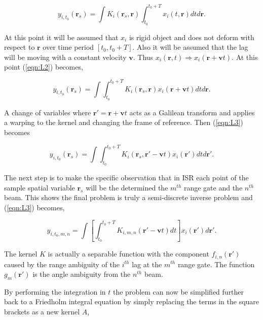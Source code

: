 \documentclass[10pt]{article}
\begin{document}
\begin{equation}
\label{eqn:L2}
y_{i,t_0}(\mathbf{r}_s) = \int K_i(\mathbf{r}_s,\mathbf{r})\int_{t_0}^{t_0+T} x_i(t,\mathbf{r})dtd\mathbf{r}.
\end{equation}

At this point it will be assumed that $x_i$ is rigid object and does not deform with respect to $\mathbf{r}$ over time period $[t_0,t_0+T]$. Also it will be assumed that the lag will be moving with a constant velocity $\mathbf{v}$. Thus $x_i(\mathbf{r},t)\Rightarrow x_i(\mathbf{r}+\mathbf{v}t)$. At this point (\ref{eqn:L2}) becomes,

\begin{equation}
\label{eqn:L3}
y_{i,t_0}(\mathbf{r}_s) = \int \int_{t_0}^{t_0+T} K_i(\mathbf{r}_s,\mathbf{r})x_i(\mathbf{r}+\mathbf{v}t)dtd\mathbf{r}.
\end{equation}

A change of variables where $\mathbf{r}' = \mathbf{r}+\mathbf{v}t$ acts as a Galilean transform and applies a warping to the kernel and changing the frame of reference. Then (\ref{eqn:L3}) becomes

\begin{equation}
\label{eqn:L4}
y_{i,t_0}(\mathbf{r}_s) = \int \int_{t_0}^{t_0+T} K_i(\mathbf{r}_s,\mathbf{r}'-\mathbf{v}t)x_i(\mathbf{r}')dtd\mathbf{r}'.
\end{equation}

The next step is to make the specific observation that in ISR each point of the sample spatial variable $\mathbf{r}_s$ will be the determined the $m^{th}$ range gate and the $n^{th}$ beam. This shows the final problem is truly a semi-discrete inverse problem and (\ref{eqn:L3}) becomes,

\begin{equation}
\label{eqn:L5}
y_{i,t_0,m,n}= \int \left[ \int_{t_0}^{t_0+T} K_{i,m,n}(\mathbf{r}'-\mathbf{v}t)dt \right]x_i(\mathbf{r}')d\mathbf{r}'.
\end{equation}

\noindent The kernel $K$ is actually a separable function with the component $f_{i,n}(\mathbf{r}')$ caused by the range ambiguity of the $i^{th}$ lag at the $m^{th}$ range gate. The function $g_m(\mathbf{r}')$ is the angle ambiguity from the $n^{th}$ beam. 

By performing the integration in $t$ the problem can now be simplified further back to a Friedholm integral equation by simply replacing the terms  in the square brackets as a new kernel $A$,
\end{document}
